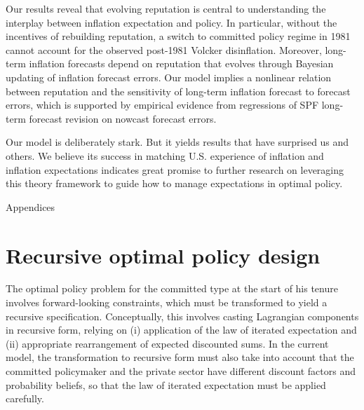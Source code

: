 \documentclass[12pt,letter,leqno]{article}
\theoremstyle{asn}
\theoremstyle{lem}
\theoremstyle{slem}
\theoremstyle{prop}
\theoremstyle{appprop}
\theoremstyle{rem}
\theoremstyle{defn}
\begin{document}
Our results reveal that evolving reputation is central to understanding the interplay between inflation expectation and policy. In particular, without the incentives of rebuilding reputation, a switch to committed policy regime in 1981 cannot account for the observed post-1981 Volcker disinflation. Moreover, long-term inflation forecasts depend on reputation that evolves through Bayesian updating of inflation forecast errors. Our model implies a nonlinear relation between reputation and the sensitivity of long-term inflation forecast to forecast errors, which is supported by empirical evidence from regressions of SPF long-term forecast revision on nowcast forecast errors. 

Our model is deliberately stark. But it yields results that have surprised us and others. We believe its success in matching U.S. experience of inflation and inflation expectations indicates great promise to further research on leveraging this theory framework to guide how to manage expectations in optimal policy.




\newpage
\baselineskip13pt 

%
%





\linespread{1}

\newpage 
\appendix
\begin{center}
{\Large {Appendices} }
\setcounter{footnote}{0}
\setcounter{page}{1}
\end{center}

\section{Recursive optimal policy design}\label{appsec:recursive}
 \renewcommand{\theequation}{A%
\arabic{equation}}

The optimal policy problem for the committed type at the start of his tenure involves forward-looking constraints, which must
be transformed to yield a recursive specification. Conceptually, this
involves casting Lagrangian components in recursive form, relying on (i) application of the law of iterated expectation and
(ii) appropriate rearrangement of expected discounted sums.
In the current model, the transformation to recursive form must also take into account that the committed policymaker and the private sector have different discount
factors and probability beliefs, so that the law of iterated expectation must
be applied carefully.
\end{document}
